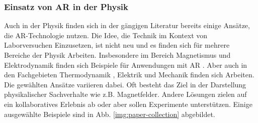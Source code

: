 \subsubsection{Einsatz von AR in der Physik}
\label{sec-2-2-2}
Auch in der Physik finden sich in der gängigen Literatur bereits einige Ansätze, die AR-Technologie nutzen. Die Idee, die Technik im Kontext von Laborversuchen Einzusetzen, ist nicht neu und es finden sich für mehrere Bereiche der Physik Arbeiten. Insbesondere im Bereich Magnetismus und Elektrodynamik finden sich Beispiele für Anwendungen mit AR \cite{Ibanez14, Matsutomo13, Mannuss11, Buchau09}. Aber auch in den Fachgebieten Thermodynamik \cite{Strzys17, Strzys18}, Elektrik \cite{Akcayir16, Amiraslanov18, Javaheri18} und Mechanik \cite{Li11, Jerry10, Kaufmann08} finden sich Arbeiten. Die gewählten Ansätze variieren dabei. Oft besteht das Ziel in der Darstellung physikalischer Sachverhalte wie z.B. Magnetfelder. Andere Lösungen zielen auf ein kollaboratives Erlebnis ab oder aber sollen Experimente unterstützen. Einige ausgewählte Beispiele sind in Abb. \ref{img:paper-collection} abgebildet. 

